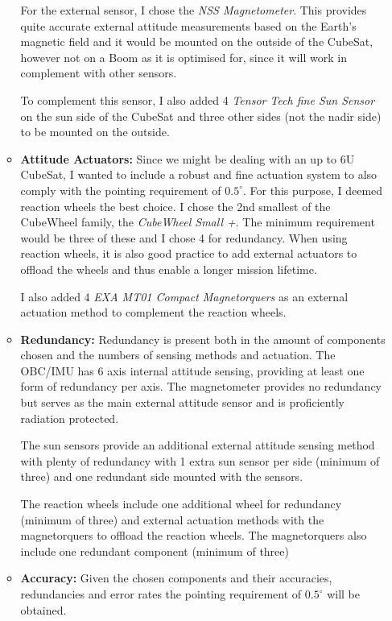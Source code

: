 \begin{itemize}
\begin{itemize}
        For the external sensor, I chose the \textit{NSS Magnetometer}. 
        This provides quite accurate external attitude measurements based on the Earth's magnetic field and it would be mounted on the outside of the CubeSat, however not on a Boom as it is optimised for, since it will work in complement with other sensors.
        
        To complement this sensor, I also added 4 \textit{Tensor Tech fine Sun Sensor} on the sun side of the CubeSat and three other sides (not the nadir side) to be mounted on the outside.

        \item \textbf{Attitude Actuators:}
        Since we might be dealing with an up to 6U CubeSat, I wanted to include a robust and fine actuation system to also comply with the pointing requirement of $0.5^{\circ}$. 
        For this purpose, I deemed reaction wheels the best choice. 
        I chose the 2nd smallest of the CubeWheel family, the \textit{CubeWheel Small +}. 
        The minimum requirement would be three of these and I chose 4 for redundancy.
        When using reaction wheels, it is also good practice to add external actuators to offload the wheels and thus enable a longer mission lifetime.

        I also added 4 \textit{EXA MT01 Compact Magnetorquers} as an external actuation method to complement the reaction wheels.

        \item \textbf{Redundancy:}
        Redundancy is present both in the amount of components chosen and the numbers of sensing methods and actuation.
        The OBC/IMU has 6 axis internal attitude sensing, providing at least one form of redundancy per axis. 
        The magnetometer provides no redundancy but serves as the main external attitude sensor and is proficiently radiation protected.
        
        The sun sensors provide an additional external attitude sensing method with plenty of redundancy with 1 extra sun sensor per side (minimum of three) and one redundant side mounted with the sensors.

        The reaction wheels include one additional wheel for redundancy (minimum of three) and external actuation methods with the magnetorquers to offload the reaction wheels. 
        The magnetorquers also include one redundant component (minimum of three)

        \item \textbf{Accuracy:}
        Given the chosen components and their accuracies, redundancies and error rates the pointing requirement of $0.5^{\circ}$ will be obtained.
    \end{itemize}
    
\end{itemize}

